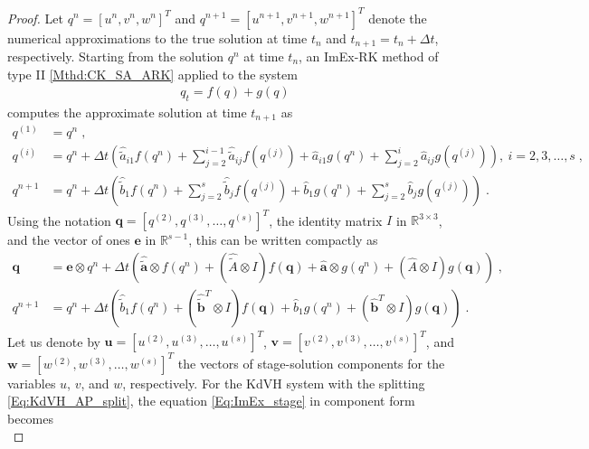 \documentclass{article}
\newcommand{\tIIAex}{\hat{\tilde{A}}}
\newcommand{\tIIaex}{\pmb{\hat{\tilde{a}}}}
\newcommand{\tIIbexf}{\hat{\tilde{b}}_1}
\newcommand{\tIIbex}{\pmb{\hat{\tilde{b}}}}
\newcommand{\tIIAim}{\hat{A}}
\newcommand{\tIIaim}{\pmb{\hat{a}}}
\newcommand{\tIIbim}{\pmb{\hat{b}}}
\newcommand{\tIIbimf}{\hat{b}_1}
\begin{document}
\begin{proof}
Let $q^n = [u^n, v^n, w^n]^T$ and $q^{n+1} = [u^{n+1}, v^{n+1}, w^{n+1}]^T$ denote the numerical approximations to the true solution at time $t_n$ and $t_{n+1} = t_n + \Delta t$, respectively.
Starting from the solution $q^n$ at time $t_n$, an ImEx-RK method of type II \eqref{Mthd:CK_SA_ARK} applied to the system
\begin{align*}
    q_t = f(q) + g(q)
\end{align*}
computes the approximate solution at time $t_{n+1}$ as
\begin{subequations}\label{Eq:ImEx_mthd}
\begin{align}
    q^{(1)} & = q^n \;, \\
    q^{(i)} & = q^n + \Delta t \left( \hat{\tilde{a}}_{i1} f(q^n) + \sum_{j = 2}^{i-1} \hat{\tilde{a}}_{ij} f(q^{(j)}) + \hat{a}_{i1} g(q^n) + \sum_{j = 2}^{i} \hat{a}_{ij} g(q^{(j)}) \right), \ i = 2,3, \ldots, s \;, \\
    q^{n+1} & = q^n + \Delta t \left( \tIIbexf f(q^n) + \sum_{j = 2}^{s} \hat{\tilde{b}}_{j} f(q^{(j)}) + \tIIbimf g(q^n) + \sum_{j = 2}^{s} \hat{b}_{j}  g(q^{(j)}) \right) \;.
\end{align}
\end{subequations}
Using the notation $\pmb{q} = [q^{(2)}, q^{(3)}, \dots, q^{(s)}]^T$, the identity matrix $I$ in $\mathbb{R}^{3 \times 3}$, and the vector of ones $\pmb{e}$ in $\mathbb{R}^{s-1}$, this can be written compactly as
\begin{subequations}
\begin{align}
    \pmb{q} &= \pmb{e} \otimes q^n + \Delta t \left( \tIIaex \otimes f(q^n) + (\tIIAex \otimes I) f(\pmb{q}) + \tIIaim \otimes g(q^n) + (\tIIAim \otimes I) g(\pmb{q}) \right) \;, \label{Eq:ImEx_stage} \\
    q^{n+1} &= q^n + \Delta t \left( \tIIbexf f(q^n) + (\tIIbex^T \otimes I) f(\pmb{q}) + \tIIbimf g(q^n) + (\tIIbim^T \otimes I) g(\pmb{q}) \right) \;. \label{Eq:ImEx_sol}
\end{align}
\end{subequations}
Let us denote by $\pmb{u} = [u^{(2)}, u^{(3)}, \dots, u^{(s)}]^T$, $\pmb{v} = [v^{(2)}, v^{(3)}, \dots, v^{(s)}]^T$, and $\pmb{w} = [w^{(2)}, w^{(3)}, \dots, w^{(s)}]^T$ the vectors of stage-solution components for the variables $u$, $v$, and $w$, respectively. For the KdVH system with the splitting \eqref{Eq:KdVH_AP_split}, the equation \eqref{Eq:ImEx_stage} in component form becomes
\begin{subequations}

\end{subequations}
\end{proof}
\end{document}
